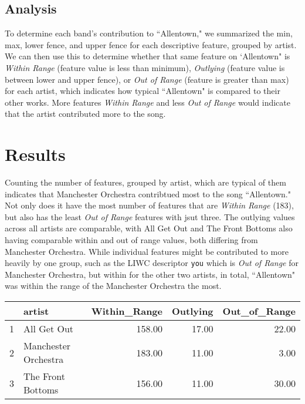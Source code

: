 \documentclass{article}\usepackage[]{graphicx}\usepackage[]{xcolor}
\begin{document}
\begin{multicols}{2}
\subsection{Analysis}
To determine each band's contribution to ``Allentown," we summarized the min, max, lower fence, and upper fence for each descriptive feature, grouped by artist. We can then use this to determine whether that same feature on `Allentown" is \emph{Within Range} (feature value is less than minimum), \emph{Outlying} (feature value is between lower and upper fence), or \emph{Out of Range} (feature is greater than max) for each artist, which indicates how typical ``Allentown" is compared to their other works. More features \emph{Within Range} and less \emph{Out of Range} would indicate that the artist contributed more to the song. 


\section{Results}
Counting the number of features, grouped by artist, which are typical of them indicates that Manchester Orchestra contribtued most to the song ``Allentown." Not only does it have the most number of features that are \emph{Within Range} (183), but also has the least \emph{Out of Range} features with jsut three. The outlying values across all artists are comparable, with All Get Out and The Front Bottoms also having comparable within and out of range values, both differing from Manchester Orchestra. While individual features might be contributed to more heavily by one group, such as the LIWC descriptor \texttt{you} which is \emph{Out of Range} for Manchester Orchestra, but within for the other two artists, in total, ``Allentown" was within the range of the Manchester Orchestra the most.

\begin{table}[ht]
\centering
\begin{tabular}{rlrrr}
  \hline
 & artist & Within\_Range & Outlying & Out\_of\_Range \\ 
  \hline
1 & All Get Out & 158.00 & 17.00 & 22.00 \\ 
  2 & Manchester Orchestra & 183.00 & 11.00 & 3.00 \\ 
  3 & The Front Bottoms & 156.00 & 11.00 & 30.00 \\ 
   \hline
\end{tabular}
\end{table}



\end{multicols}
\end{document}
